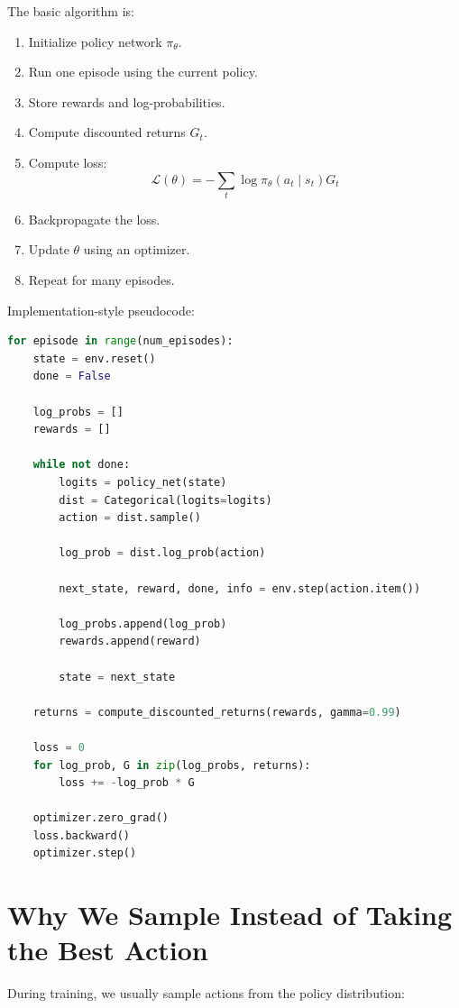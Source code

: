 \documentclass[11pt]{article}
\begin{document}
The basic algorithm is:

\begin{enumerate}[leftmargin=2em]
    \item Initialize policy network $\pi_\theta$.
    \item Run one episode using the current policy.
    \item Store rewards and log-probabilities.
    \item Compute discounted returns $G_t$.
    \item Compute loss:
    \[
    \mathcal{L}(\theta)
    = - \sum_t \log \pi_\theta(a_t \mid s_t)G_t
    \]
    \item Backpropagate the loss.
    \item Update $\theta$ using an optimizer.
    \item Repeat for many episodes.
\end{enumerate}

Implementation-style pseudocode:

\begin{lstlisting}[language=Python]
for episode in range(num_episodes):
    state = env.reset()
    done = False

    log_probs = []
    rewards = []

    while not done:
        logits = policy_net(state)
        dist = Categorical(logits=logits)
        action = dist.sample()

        log_prob = dist.log_prob(action)

        next_state, reward, done, info = env.step(action.item())

        log_probs.append(log_prob)
        rewards.append(reward)

        state = next_state

    returns = compute_discounted_returns(rewards, gamma=0.99)

    loss = 0
    for log_prob, G in zip(log_probs, returns):
        loss += -log_prob * G

    optimizer.zero_grad()
    loss.backward()
    optimizer.step()
\end{lstlisting}

\section{Why We Sample Instead of Taking the Best Action}

During training, we usually sample actions from the policy distribution:
\end{document}
